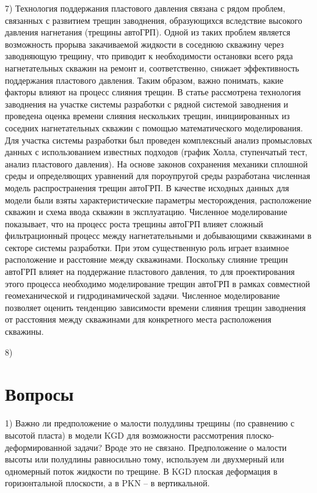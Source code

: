 \documentclass[a4paper, 12pt]{article}
\begin{document}
7) Технология поддержания пластового давления связана с рядом проблем, связанных с развитием трещин заводнения, образующихся вследствие высокого давления нагнетания (трещины автоГРП).
Одной из таких проблем является возможность прорыва закачиваемой жидкости в соседнюю скважину через заводняющую трещину, что приводит к необходимости остановки всего ряда нагнетательных скважин на ремонт и, соответственно, снижает эффективность поддержания пластового давления.
Таким образом, важно понимать, какие факторы влияют на процесс слияния трещин. \hspace{10pt} В статье рассмотрена технология заводнения на участке системы разработки с рядной системой заводнения и проведена оценка времени слияния нескольких трещин, инициированных из соседних нагнетательных скважин с помощью математического моделирования.
Для участка системы разработки был проведен комплексный анализ промысловых данных с использованием известных подходов (график Холла, ступенчатый тест, анализ пластового давления).
На основе законов сохранения механики сплошной среды и определяющих уравнений для пороупругой среды разработана численная модель распространения трещин автоГРП.
В качестве исходных данных для модели были взяты характеристические параметры месторождения, расположение скважин и схема ввода скважин в эксплуатацию.
Численное моделирование показывает, что на процесс роста трещины автоГРП влияет сложный фильтрационный процесс между нагнетательными и добывающими скважинами в секторе системы разработки.
При этом существенную роль играет взаимное расположение и расстояние между скважинами.
Поскольку слияние трещин автоГРП влияет на поддержание пластового давления, то для проектирования этого процесса необходимо моделирование трещин автоГРП в рамках совместной геомеханической и гидродинамической задачи.
Численное моделирование позволяет оценить тенденцию зависимости времени слияния трещин заводнения от расстояния между скважинами для конкретного места расположения скважины.

8)
\\

\section{Вопросы}

1) Важно ли предположение о малости полудлины трещины (по сравнению с высотой пласта) в модели KGD для возможности рассмотрения плоско-деформированной задачи?
Вроде это не связано.
Предположение о малости высоты или полудлины равносильно тому, используем ли двухмерный или одномерный поток жидкости по трещине.
В KGD плоская деформация в горизонтальной плоскости, а в PKN -- в вертикальной.
\end{document}
